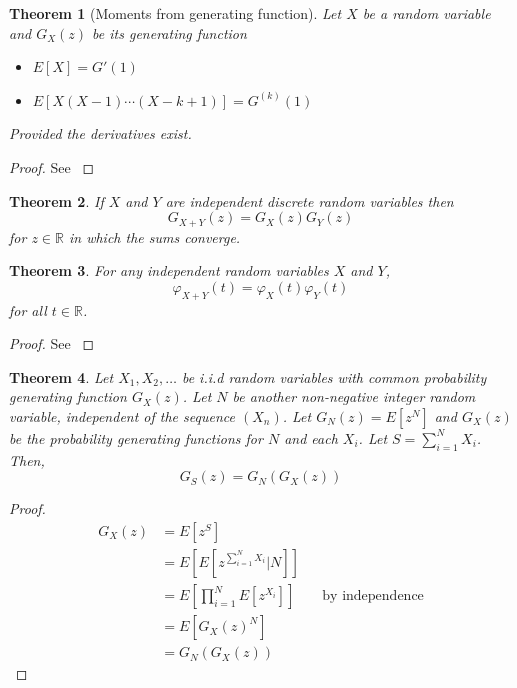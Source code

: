\documentclass{article}
\theoremstyle{plain}
\newtheorem{theorem}{Theorem}[section]
\theoremstyle{definition}
\theoremstyle{remark}
\numberwithin{equation}{section}
\newcommand{\R}{\mathbb{R}}
\begin{document}
\begin{theorem}[Moments from generating function] \cite{grimmett2001}
Let $X$ be a random variable and $G_X(z)$ be its generating function
\begin{itemize}
    \item $E[X] = G'(1)$
    \item $E[X (X - 1) \cdots (X - k + 1)] = G^{(k)}(1)$
\end{itemize}
Provided the derivatives exist.
\end{theorem}

\begin{proof}
See \cite{grimmett2001}
\end{proof}

\begin{theorem}
If $X$ and $Y$ are independent discrete random variables then
$$
G_{X + Y}(z) = G_X(z) G_Y(z)
$$
for $z \in \R$ in which the sums converge.
\end{theorem}

\begin{theorem}
For any independent random variables $X$ and $Y$, 
$$
\varphi_{X + Y}(t) = \varphi_X(t) \varphi_Y(t)
$$
for all $t \in \R$.
\end{theorem}

\begin{proof}
See \cite{grimmett2001}
\end{proof}

\begin{theorem}\label{thm:generating_random_sum}
Let $X_1, X_2, \ldots$ be i.i.d random variables with common probability generating function $G_X(z)$.
Let $N$ be another non-negative integer random variable, independent of the sequence $(X_n)$.
Let $G_N(z) = E[z^N]$ and $G_X(z)$ be the probability generating functions for $N$ and each $X_i$.
Let $S = \sum_{i = 1}^N X_i$.
Then,
$$
G_S(z) = G_N(G_X(z))
$$
\end{theorem}

\begin{proof}
\begin{align*}
    G_X(z) &= E[ z^S ]\\
    &= E[ E[ z^{\sum_{i = 1}^N X_i} | N ]]\\
    &= E \left[ \prod_{i = 1}^N E[z^{X_i}] \right] && \text{by independence}\\
    &= E[ G_X(z)^N]\\
    &= G_N(G_X(z))
\end{align*}
\end{proof}
\end{document}
